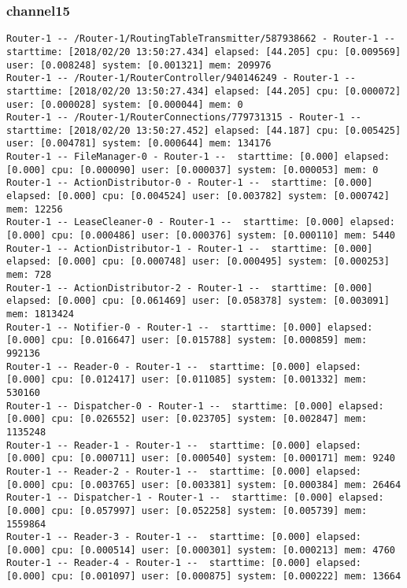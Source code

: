\subsubsection*{channel15}

\begin{lstlisting}[language=config]
Router-1 -- /Router-1/RoutingTableTransmitter/587938662 - Router-1 --  starttime: [2018/02/20 13:50:27.434] elapsed: [44.205] cpu: [0.009569] user: [0.008248] system: [0.001321] mem: 209976
Router-1 -- /Router-1/RouterController/940146249 - Router-1 --  starttime: [2018/02/20 13:50:27.434] elapsed: [44.205] cpu: [0.000072] user: [0.000028] system: [0.000044] mem: 0
Router-1 -- /Router-1/RouterConnections/779731315 - Router-1 --  starttime: [2018/02/20 13:50:27.452] elapsed: [44.187] cpu: [0.005425] user: [0.004781] system: [0.000644] mem: 134176
Router-1 -- FileManager-0 - Router-1 --  starttime: [0.000] elapsed: [0.000] cpu: [0.000090] user: [0.000037] system: [0.000053] mem: 0
Router-1 -- ActionDistributor-0 - Router-1 --  starttime: [0.000] elapsed: [0.000] cpu: [0.004524] user: [0.003782] system: [0.000742] mem: 12256
Router-1 -- LeaseCleaner-0 - Router-1 --  starttime: [0.000] elapsed: [0.000] cpu: [0.000486] user: [0.000376] system: [0.000110] mem: 5440
Router-1 -- ActionDistributor-1 - Router-1 --  starttime: [0.000] elapsed: [0.000] cpu: [0.000748] user: [0.000495] system: [0.000253] mem: 728
Router-1 -- ActionDistributor-2 - Router-1 --  starttime: [0.000] elapsed: [0.000] cpu: [0.061469] user: [0.058378] system: [0.003091] mem: 1813424
Router-1 -- Notifier-0 - Router-1 --  starttime: [0.000] elapsed: [0.000] cpu: [0.016647] user: [0.015788] system: [0.000859] mem: 992136
Router-1 -- Reader-0 - Router-1 --  starttime: [0.000] elapsed: [0.000] cpu: [0.012417] user: [0.011085] system: [0.001332] mem: 530160
Router-1 -- Dispatcher-0 - Router-1 --  starttime: [0.000] elapsed: [0.000] cpu: [0.026552] user: [0.023705] system: [0.002847] mem: 1135248
Router-1 -- Reader-1 - Router-1 --  starttime: [0.000] elapsed: [0.000] cpu: [0.000711] user: [0.000540] system: [0.000171] mem: 9240
Router-1 -- Reader-2 - Router-1 --  starttime: [0.000] elapsed: [0.000] cpu: [0.003765] user: [0.003381] system: [0.000384] mem: 26464
Router-1 -- Dispatcher-1 - Router-1 --  starttime: [0.000] elapsed: [0.000] cpu: [0.057997] user: [0.052258] system: [0.005739] mem: 1559864
Router-1 -- Reader-3 - Router-1 --  starttime: [0.000] elapsed: [0.000] cpu: [0.000514] user: [0.000301] system: [0.000213] mem: 4760
Router-1 -- Reader-4 - Router-1 --  starttime: [0.000] elapsed: [0.000] cpu: [0.001097] user: [0.000875] system: [0.000222] mem: 13664

\end{lstlisting}
